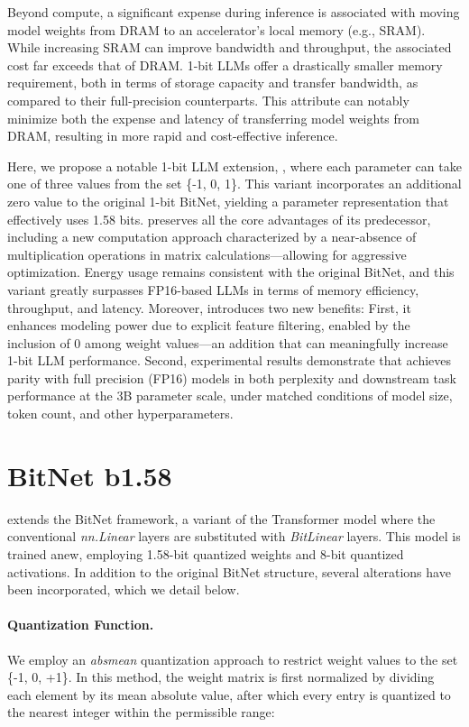 Beyond compute, a significant expense during inference is associated with moving model weights from DRAM to an accelerator’s local memory (e.g., SRAM). While increasing SRAM can improve bandwidth and throughput, the associated cost far exceeds that of DRAM. 1-bit LLMs offer a drastically smaller memory requirement, both in terms of storage capacity and transfer bandwidth, as compared to their full-precision counterparts. This attribute can notably minimize both the expense and latency of transferring model weights from DRAM, resulting in more rapid and cost-effective inference.

Here, we propose a notable 1-bit LLM extension, \textbf{}, where each parameter can take one of three values from the set \{-1, 0, 1\}. This variant incorporates an additional zero value to the original 1-bit BitNet, yielding a parameter representation that effectively uses 1.58 bits.  preserves all the core advantages of its predecessor, including a new computation approach characterized by a near-absence of multiplication operations in matrix calculations—allowing for aggressive optimization. Energy usage remains consistent with the original BitNet, and this variant greatly surpasses FP16-based LLMs in terms of memory efficiency, throughput, and latency. Moreover,  introduces two new benefits: First, it enhances modeling power due to explicit feature filtering, enabled by the inclusion of 0 among weight values—an addition that can meaningfully increase 1-bit LLM performance. Second, experimental results demonstrate that  achieves parity with full precision (FP16) models in both perplexity and downstream task performance at the 3B parameter scale, under matched conditions of model size, token count, and other hyperparameters.

\section{BitNet b1.58}

 extends the BitNet framework, a variant of the Transformer model where the conventional \emph{nn.Linear} layers are substituted with \emph{BitLinear} layers. This model is trained anew, employing 1.58-bit quantized weights and 8-bit quantized activations. In addition to the original BitNet structure, several alterations have been incorporated, which we detail below.

\paragraph{Quantization Function.} We employ an \emph{absmean} quantization approach to restrict weight values to the set \{-1, 0, +1\}. In this method, the weight matrix is first normalized by dividing each element by its mean absolute value, after which every entry is quantized to the nearest integer within the permissible range:

